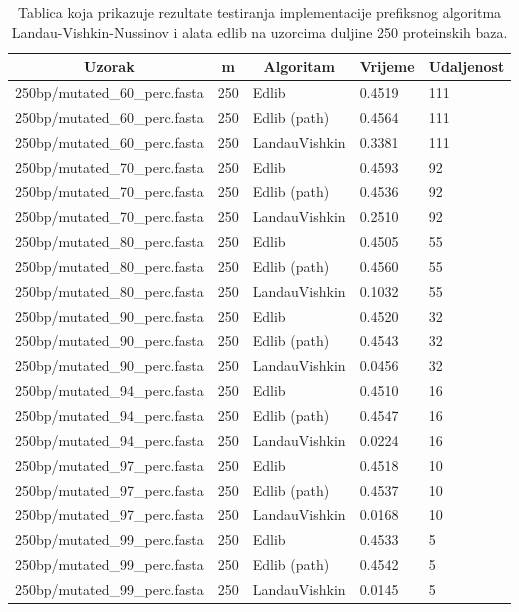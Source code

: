 \documentclass[times, utf8, zavrsni]{fer}
\begin{document}
\begin{table}[]
\centering
\begin{tabular}{|l|l|l|l|l|}
\hline
\multicolumn{1}{|c|}{Uzorak} & \multicolumn{1}{c|}{m} & \multicolumn{1}{c|}{Algoritam} & \multicolumn{1}{c|}{Vrijeme} & \multicolumn{1}{c|}{Udaljenost} \\ \hline
250bp/mutated\_60\_perc.fasta & 250 & Edlib & 0.4519 & 111 \\ \hline
250bp/mutated\_60\_perc.fasta & 250 & Edlib (path) & 0.4564 & 111 \\ \hline
250bp/mutated\_60\_perc.fasta & 250 & LandauVishkin & 0.3381 & 111 \\ \hline
250bp/mutated\_70\_perc.fasta & 250 & Edlib & 0.4593 & 92 \\ \hline
250bp/mutated\_70\_perc.fasta & 250 & Edlib (path) & 0.4536 & 92 \\ \hline
250bp/mutated\_70\_perc.fasta & 250 & LandauVishkin & 0.2510 & 92 \\ \hline
250bp/mutated\_80\_perc.fasta & 250 & Edlib & 0.4505 & 55 \\ \hline
250bp/mutated\_80\_perc.fasta & 250 & Edlib (path) & 0.4560 & 55 \\ \hline
250bp/mutated\_80\_perc.fasta & 250 & LandauVishkin & 0.1032 & 55 \\ \hline
250bp/mutated\_90\_perc.fasta & 250 & Edlib & 0.4520 & 32 \\ \hline
250bp/mutated\_90\_perc.fasta & 250 & Edlib (path) & 0.4543 & 32 \\ \hline
250bp/mutated\_90\_perc.fasta & 250 & LandauVishkin & 0.0456 & 32 \\ \hline
250bp/mutated\_94\_perc.fasta & 250 & Edlib & 0.4510 & 16 \\ \hline
250bp/mutated\_94\_perc.fasta & 250 & Edlib (path) & 0.4547 & 16 \\ \hline
250bp/mutated\_94\_perc.fasta & 250 & LandauVishkin & 0.0224 & 16 \\ \hline
250bp/mutated\_97\_perc.fasta & 250 & Edlib & 0.4518 & 10 \\ \hline
250bp/mutated\_97\_perc.fasta & 250 & Edlib (path) & 0.4537 & 10 \\ \hline
250bp/mutated\_97\_perc.fasta & 250 & LandauVishkin & 0.0168 & 10 \\ \hline
250bp/mutated\_99\_perc.fasta & 250 & Edlib & 0.4533 & 5 \\ \hline
250bp/mutated\_99\_perc.fasta & 250 & Edlib (path) & 0.4542 & 5 \\ \hline
250bp/mutated\_99\_perc.fasta & 250 & LandauVishkin & 0.0145 & 5 \\ \hline
\end{tabular}
\caption{Tablica koja prikazuje rezultate testiranja implementacije prefiksnog algoritma Landau-Vishkin-Nussinov i alata edlib na uzorcima duljine 250 proteinskih baza.}
\label{tab:resultsPrefix250}
\end{table}
\end{document}
